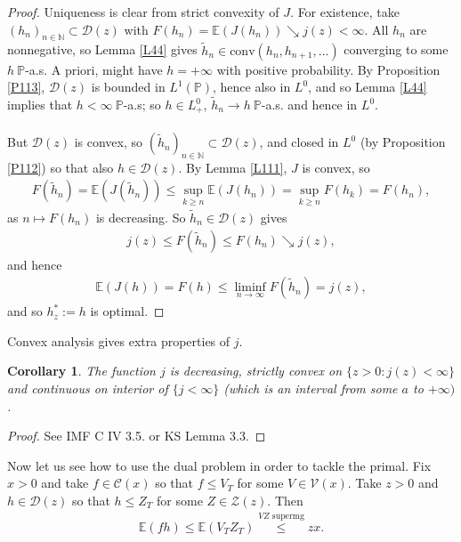 \documentclass[12pt,a4paper, twoside]{article}
\newtheorem{cor}{Corollary}[section]
\theoremstyle{definition}
\newcommand{\EE}{\mathbb{E}} %
\newcommand{\PP}{\mathbb{P}} %
\begin{document}
\begin{proof}
Uniqueness is clear  from strict convexity of $J$. For existence, take $(h_n)_{n \in \mathbb{N}} \subset \mathcal{D}(z)$ with $F(h_n)= \EE(J(h_n)) \searrow j(z) < \infty$. All $h_n$ are nonnegative, so Lemma \ref{L44} gives $\widetilde{h}_n \in \text{conv}(h_n, h_{n+1}, \dots )$ converging to some $h \ \PP$-a.s. A priori, might have $h= + \infty$ with positive probability. By Proposition \ref{P113}, $\mathcal{D}(z)$ is bounded in $L^1( \PP)$, hence also in $L^0$, and so Lemma \ref{L44} implies that $h < \infty \ \PP$-a.s; so $h \in L_+^0$, $\widetilde{h}_n \to h \ \PP$-a.s. and hence in $L^0$. \\
\\
But $\mathcal{D}(z)$ is convex, so $(\widetilde{h}_n)_{n \in \mathbb{N}} \subset \mathcal{D}(z)$, and closed in $L^0$ (by Proposition \ref{P112}) so that also $h \in \mathcal{D}(z)$. By Lemma \ref{L111}, $J$ is convex, so
\begin{align*}
F( \widetilde{h}_n) = \EE(J( \widetilde{h}_n)) \leq \sup_{k \geq n} \EE(J(h_n)) = \sup_{k \geq n } F(h_k) = F(h_n),
\end{align*}
as $n \mapsto F(h_n)$ is decreasing. So $\widetilde{h}_n \in \mathcal{D}(z)$ gives 
\begin{align*}
j(z) \leq F( \widetilde{h}_n) \leq F(h_n) \searrow j(z),
\end{align*}
and hence 
\begin{align*}
\EE(J(h)) = F(h) \leq \liminf_{n \to \infty} F( \widetilde{h}_n) = j(z),
\end{align*}
and so $h_z^* := h$ is optimal. 
\end{proof}
Convex analysis gives extra properties of $j$.
\begin{cor} \label{C115} The function $j$ is decreasing, strictly convex on $\{ z >0: j(z) < \infty\}$ and continuous on interior of $\{j < \infty\}$ (which is an interval from some $a$ to $+ \infty)$.
\end{cor}
\begin{proof}
See IMF C IV 3.5. or KS Lemma 3.3.
\end{proof}
Now let us see how to use the dual problem in order to tackle the primal. Fix $x>0$ and take $f \in \mathcal{C}(x)$ so that $f \leq V_T$ for some $V \in \mathcal{V}(x)$. Take $z>0$ and $h \in \mathcal{D}(z)$ so that $h \leq Z_T$ for some $Z \in \mathcal{Z}(z)$. Then 
\begin{align*}
\EE(fh) \leq \EE(V_T Z_T) \overset{VZ \text{ supermg}}\leq zx.
\end{align*}
\end{document}
